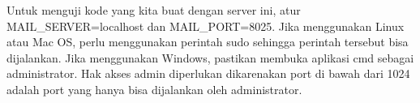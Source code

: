 Untuk menguji kode yang kita buat dengan server ini, atur MAIL_SERVER=localhost dan MAIL_PORT=8025. Jika menggunakan Linux atau Mac OS, perlu menggunakan perintah sudo sehingga perintah tersebut bisa dijalankan. Jika menggunakan Windows, pastikan membuka aplikasi cmd sebagai administrator. Hak akses admin diperlukan dikarenakan port di bawah dari 1024 adalah port yang hanya bisa dijalankan oleh administrator. 



